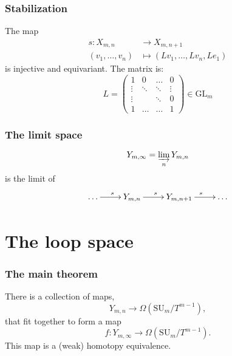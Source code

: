 \documentclass{beamer} %
\newcommand{\SUT}[1]{\SU_{#1}/T^{#1-1}}
\newcommand{\GL}{\mathrm{GL}}
\newcommand{\SU}{\mathrm{SU}}
\begin{document}
\begin{frame}
  \frametitle{Stabilization}
  \begin{definition}
    The map
    \begin{align*}
      s : X_{m,n} &\to X_{m,n+1} \\
      (v_1,\dots,v_n) &\mapsto (Lv_1,\dots,Lv_n,Le_1)
    \end{align*}
    is injective and equivariant. The matrix is:
    \[ L = 
    \begin{pmatrix}
      1 & 0 & \dots & 0 \\
      \vdots & \ddots & \ddots & \vdots \\
      \vdots &  & \ddots & 0 \\
      1 & \dots & \dots & 1
    \end{pmatrix} \in \GL_m \]
  \end{definition}
\end{frame}

\begin{frame}
  \frametitle{The limit space}
  \begin{definition}
    \[ Y_{m,\infty} = \varinjlim_n Y_{m,n} \]
    is the limit of
    \[ \xymatrix{ \dots \ar[r]^s & Y_{m,n} \ar[r]^s & Y_{m,n+1} \ar[r]^s
      & \dots } \]
  \end{definition}
\end{frame}


\section{The loop space}


\begin{frame}
  \frametitle{The main theorem}
  \begin{theorem}
    There is a collection of maps,
    \[ Y_{m,n} \to \Omega(\SUT{m}), \]
    that fit together to form a map
    \[ f : Y_{m,\infty} \to \Omega(\SUT{m}). \]
    This map is a (weak) homotopy equivalence.
  \end{theorem}
\end{frame}
\end{document}
